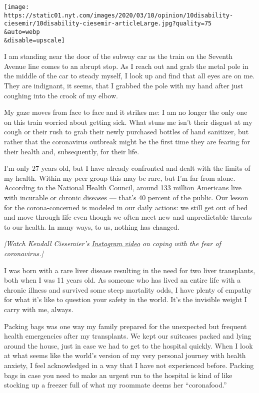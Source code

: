 \texttt{[image: https://static01.nyt.com/images/2020/03/10/opinion/10disability-ciesemir/10disability-ciesemir-articleLarge.jpg?quality=75\\\&auto=webp\\\&disable=upscale]}

I am standing near the door of the subway car as the train on the
Seventh Avenue line comes to an abrupt stop. As I reach out and grab the
metal pole in the middle of the car to steady myself, I look up and find
that all eyes are on me. They are indignant, it seems, that I grabbed
the pole with my hand after just coughing into the crook of my elbow.

My gaze moves from face to face and it strikes me: I am no longer the
only one on this train worried about getting sick. What stuns me isn't
their disgust at my cough or their rush to grab their newly purchased
bottles of hand sanitizer, but rather that the coronavirus outbreak
might be the first time they are fearing for their health and,
subsequently, for their life.

I'm only 27 years old, but I have already confronted and dealt with the
limits of my health. Within my peer group this may be rare, but I'm far
from alone. According to the National Health Council, around
\href{https://nationalhealthcouncil.org/wp-content/uploads/2019/12/AboutChronicDisease.pdf}{133
million Americans live with incurable or chronic diseases} --- that's 40
percent of the public. Our lesson for the corona-concerned is modeled in
our daily actions: we still get out of bed and move through life even
though we often meet new and unpredictable threats to our health. In
many ways, to us, nothing has changed.

\emph{{[}Watch Kendall Ciesemier's}
\href{https://www.instagram.com/p/B9keeraBm_N/}{\emph{Instagram video}}
\emph{on coping with the fear of coronavirus.{]}}

I was born with a rare liver disease resulting in the need for two liver
transplants, both when I was 11 years old. As someone who has lived an
entire life with a chronic illness and survived some steep mortality
odds, I have plenty of empathy for what it's like to question your
safety in the world. It's the invisible weight I carry with me, always.

Packing bags was one way my family prepared for the unexpected but
frequent health emergencies after my transplants. We kept our suitcases
packed and lying around the house, just in case we had to get to the
hospital quickly. When I look at what seems like the world's version of
my very personal journey with health anxiety, I feel acknowledged in a
way that I have not experienced before. Packing bags in case you need to
make an urgent run to the hospital is kind of like stocking up a freezer
full of what my roommate deems her ``coronafood.''

